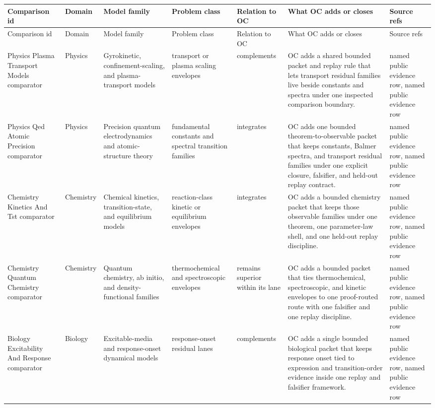 \begin{longtable}{@{}L{0.14\textwidth}L{0.09\textwidth}L{0.14\textwidth}L{0.12\textwidth}L{0.10\textwidth}L{0.18\textwidth}L{0.15\textwidth}@{}}
\toprule
Comparison id & Domain & Model family & Problem class & Relation to OC & What OC adds or closes & Source refs \\
\midrule
\endfirsthead
\toprule
Comparison id & Domain & Model family & Problem class & Relation to OC & What OC adds or closes & Source refs \\
\midrule
\endhead
Physics Plasma Transport Models comparator & Physics & Gyrokinetic, confinement-scaling, and plasma-transport models & transport or plasma scaling envelopes & complements & OC adds a shared bounded packet and replay rule that lets transport residual families live beside constants and spectra under one inspected comparison boundary. & named public evidence row, named public evidence row \\
Physics Qed Atomic Precision comparator & Physics & Precision quantum electrodynamics and atomic-structure theory & fundamental constants and spectral transition families & integrates & OC adds one bounded theorem-to-observable packet that keeps constants, Balmer spectra, and transport residual families under one explicit closure, falsifier, and held-out replay contract. & named public evidence row, named public evidence row \\
Chemistry Kinetics And Tst comparator & Chemistry & Chemical kinetics, transition-state, and equilibrium models & reaction-class kinetic or equilibrium envelopes & integrates & OC adds a bounded chemistry packet that keeps those observable families under one theorem, one parameter-law shell, and one held-out replay discipline. & named public evidence row, named public evidence row \\
Chemistry Quantum Chemistry comparator & Chemistry & Quantum chemistry, ab initio, and density-functional families & thermochemical and spectroscopic envelopes & remains superior within its lane & OC adds a bounded packet that ties thermochemical, spectroscopic, and kinetic envelopes to one proof-routed route with one falsifier and one replay discipline. & named public evidence row, named public evidence row \\
Biology Excitability And Response comparator & Biology & Excitable-media and response-onset dynamical models & response-onset residual lanes & complements & OC adds a single bounded biological packet that keeps response onset tied to expression and transition-order evidence inside one replay and falsifier framework. & named public evidence row, named public evidence row \\

\end{longtable}
